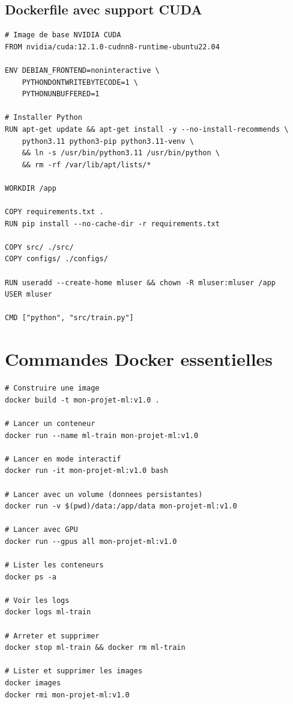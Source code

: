\subsection{Dockerfile avec support CUDA}

\begin{codeblock}[title=\textbf{Dockerfile GPU avec CUDA}]
\begin{verbatim}
# Image de base NVIDIA CUDA
FROM nvidia/cuda:12.1.0-cudnn8-runtime-ubuntu22.04

ENV DEBIAN_FRONTEND=noninteractive \
    PYTHONDONTWRITEBYTECODE=1 \
    PYTHONUNBUFFERED=1

# Installer Python
RUN apt-get update && apt-get install -y --no-install-recommends \
    python3.11 python3-pip python3.11-venv \
    && ln -s /usr/bin/python3.11 /usr/bin/python \
    && rm -rf /var/lib/apt/lists/*

WORKDIR /app

COPY requirements.txt .
RUN pip install --no-cache-dir -r requirements.txt

COPY src/ ./src/
COPY configs/ ./configs/

RUN useradd --create-home mluser && chown -R mluser:mluser /app
USER mluser

CMD ["python", "src/train.py"]
\end{verbatim}
\end{codeblock}

\section{Commandes Docker essentielles}
\label{sec:docker-commands}

\begin{codeblock}[title=\textbf{Cycle de vie d'un conteneur}]
\begin{verbatim}
# Construire une image
docker build -t mon-projet-ml:v1.0 .

# Lancer un conteneur
docker run --name ml-train mon-projet-ml:v1.0

# Lancer en mode interactif
docker run -it mon-projet-ml:v1.0 bash

# Lancer avec un volume (donnees persistantes)
docker run -v $(pwd)/data:/app/data mon-projet-ml:v1.0

# Lancer avec GPU
docker run --gpus all mon-projet-ml:v1.0

# Lister les conteneurs
docker ps -a

# Voir les logs
docker logs ml-train

# Arreter et supprimer
docker stop ml-train && docker rm ml-train

# Lister et supprimer les images
docker images
docker rmi mon-projet-ml:v1.0
\end{verbatim}
\end{codeblock}

